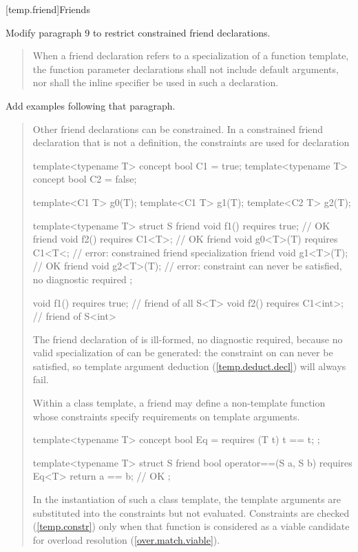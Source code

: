 \setcounter{subsection}{3}
[temp.friend]{Friends}

Modify paragraph 9 to restrict constrained friend declarations.

\begin{quote}
\setcounter{Paras}{8}
\pnum
When a friend declaration refers to a specialization of a function
template, the function parameter declarations shall not include
default arguments,  nor shall the inline specifier be used in such a
declaration.
\end{quote}

Add examples following that paragraph.

\begin{quote}
\begin{addedblock}
\pnum
\enternote
Other friend declarations can be constrained. In a constrained friend 
declaration that is not a definition, the constraints are used for declaration
\exitnote
\enterexample
\begin{codeblock}
template<typename T> concept bool C1 = true;
template<typename T> concept bool C2 = false;

template<C1 T> g0(T);
template<C1 T> g1(T);
template<C2 T> g2(T);

template<typename T>
  struct S {
    friend void f1() requires true;                  // OK
    friend void f2() requires C1<T>;           // OK
    friend void g0<T>(T) requires C1<T<; // error: constrained friend specialization
    friend void g1<T>(T);                      // OK
    friend void g2<T>(T);                      // error: constraint can never be satisfied, no diagnostic required
  };

void f1() requires true;    // friend of all S<T>
void f2() requires C1<int>; // friend of S<int>
\end{codeblock}
The friend declaration of  is ill-formed, no
diagnostic required, because no valid specialization of 
can be generated: the constraint on  can never
be satisfied, so template argument deduction
(\ref{temp.deduct.decl}) will always fail.
\exitexample

\pnum
\enternote
Within a class template, a friend may define a non-template function
whose constraints specify requirements on template arguments.
\enterexample
\begin{codeblock}
template<typename T> concept bool Eq = requires (T t) { t == t; };

template<typename T>
  struct S {
    friend bool operator==(S a, S b) requires Eq<T> { return a == b; } // OK
  };
\end{codeblock}
\exitexample
In the instantiation of such a class template, the template
arguments are substituted into the constraints but not evaluated.
Constraints are checked (\ref{temp.constr}) only when
that function is considered as a viable candidate for overload resolution
(\ref{over.match.viable}).
\exitnote
\end{addedblock}
\end{quote}



